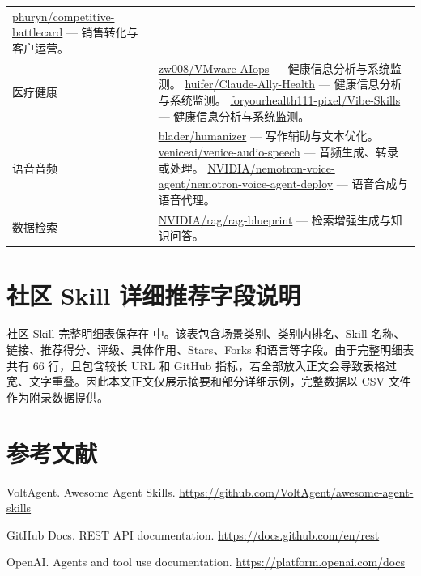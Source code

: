 \documentclass[UTF8,a4paper,12pt]{ctexart}
\begin{document}
\begin{longtable}{p{2.6cm} p{12cm}}
  \newline \href{https://github.com/phuryn/pm-skills/tree/main/pm-go-to-market/skills/competitive-battlecard}{phuryn/competitive-battlecard} — 销售转化与客户运营。\\
\addlinespace
医疗健康 & \href{https://github.com/zw008/VMware-AIops}{zw008/VMware-AIops} — 健康信息分析与系统监测。
  \newline \href{https://github.com/huifer/Claude-Ally-Health}{huifer/Claude-Ally-Health} — 健康信息分析与系统监测。
  \newline \href{https://github.com/foryourhealth111-pixel/Vibe-Skills}{foryourhealth111-pixel/Vibe-Skills} — 健康信息分析与系统监测。\\
\addlinespace
语音音频 & \href{https://github.com/blader/humanizer}{blader/humanizer} — 写作辅助与文本优化。
  \newline \href{https://github.com/veniceai/skills/tree/main/skills/venice-audio-speech}{veniceai/venice-audio-speech} — 音频生成、转录或处理。
  \newline \href{https://github.com/NVIDIA/skills/tree/main/skills/nemotron-voice-agent/nemotron-voice-agent-deploy}{NVIDIA/nemotron-voice-agent/nemotron-voice-agent-deploy} — 语音合成与语音代理。\\
\addlinespace
数据检索 & \href{https://github.com/NVIDIA/skills/tree/main/skills/rag/rag-blueprint}{NVIDIA/rag/rag-blueprint} — 检索增强生成与知识问答。\\
\bottomrule
\end{longtable}
\endgroup

\section{社区 Skill 详细推荐字段说明}

社区 Skill 完整明细表保存在  中。该表包含场景类别、类别内排名、Skill 名称、链接、推荐得分、评级、具体作用、Stars、Forks 和语言等字段。由于完整明细表共有 66 行，且包含较长 URL 和 GitHub 指标，若全部放入正文会导致表格过宽、文字重叠。因此本文正文仅展示摘要和部分详细示例，完整数据以 CSV 文件作为附录数据提供。

\section*{参考文献}
\begin{enumerate}[label={[\arabic*]}]
\item VoltAgent. Awesome Agent Skills. \url{https://github.com/VoltAgent/awesome-agent-skills}
\item GitHub Docs. REST API documentation. \url{https://docs.github.com/en/rest}
\item OpenAI. Agents and tool use documentation. \url{https://platform.openai.com/docs}
\end{enumerate}
\end{document}
